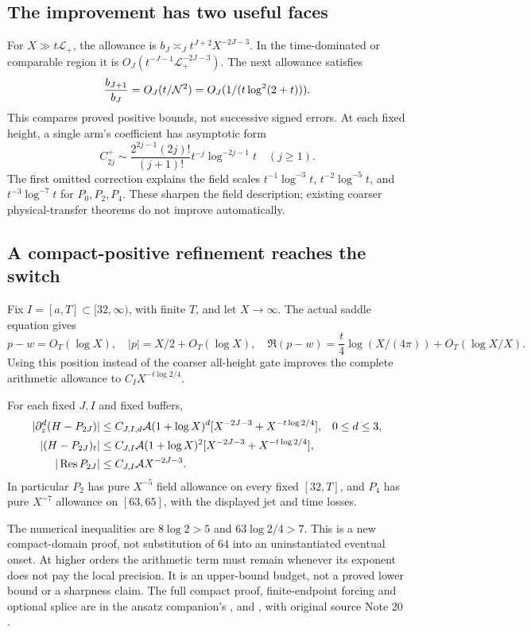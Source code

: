 \subsection{The improvement has two useful faces}
For $X\gg t\mathcal L_+$, the allowance is
$b_J\asymp_J t^{J+2}X^{-2J-3}$. In the time-dominated or comparable
region it is $O_J(t^{-J-1}\mathcal L_+^{-2J-3})$. The next allowance satisfies
\begin{equation}
 \frac{b_{J+1}}{b_J}=O_J(t/\mathcal N^2)
              =O_J(1/(t\log^2(2+t))).
 \label{eq:order-gain}
\end{equation}
This compares proved positive bounds, not successive signed errors.
At each fixed height, a single arm's coefficient has asymptotic form
\[
 C_{2j}^+\sim\frac{2^{2j-1}(2j)!}{(j+1)!}
                     t^{-j}\log^{-2j-1}t\quad(j\ge1).
\]
The first omitted correction explains the field scales
$t^{-1}\log^{-3}t$, $t^{-2}\log^{-5}t$, and $t^{-3}\log^{-7}t$
for $P_0,P_2,P_4$. These sharpen the field description; existing
coarser physical-transfer theorems do not improve automatically.

\subsection{A compact-positive refinement reaches the switch}
Fix $I=[a,T]\subset[32,\infty)$, with finite $T$, and let $X\to\infty$.
The actual saddle equation gives
\[
 p-w=O_T(\log X),\quad |p|=X/2+O_T(\log X),\quad
 \Re(p-w)=\frac t4\log(X/(4\pi))+O_T(\log X/X).
\]
Using this position instead of the coarser all-height gate improves
the complete arithmetic allowance to $C_I X^{-t\log2/4}$.

\begin{theorem}
\label{thm:compact-positive}
For each fixed $J,I$ and fixed buffers,
\begin{align}
 |\partial_z^d(H-P_{2J})|&\le C_{J,I,d}\mathcal A(1+\log X)^d
                      [X^{-2J-3}+X^{-t\log2/4}],&&0\le d\le3,\\
 |(H-P_{2J})_t|&\le C_{J,I}\mathcal A(1+\log X)^2
                      [X^{-2J-3}+X^{-t\log2/4}],\\
 |\operatorname{Res} P_{2J}|&\le C_{J,I}\mathcal A X^{-2J-3}.
 \label{eq:compact-positive}
\end{align}
In particular $P_2$ has pure $X^{-5}$ field allowance on every fixed
$[32,T]$, and $P_4$ has pure $X^{-7}$ allowance on $[63,65]$, with
the displayed jet and time losses.
\end{theorem}
The numerical inequalities are $8\log2>5$ and $63\log2/4>7$.
This is a new compact-domain proof, not substitution of $64$ into an
uninstantiated eventual onset. At higher orders the arithmetic term
must remain whenever its exponent does not pay the local precision.
It is an upper-bound budget, not a proved lower bound or a sharpness
claim. The full compact proof, finite-endpoint forcing and optional
splice are in the ansatz companion's
,
and ,
with original source Note 20 \cite{bridge}.

